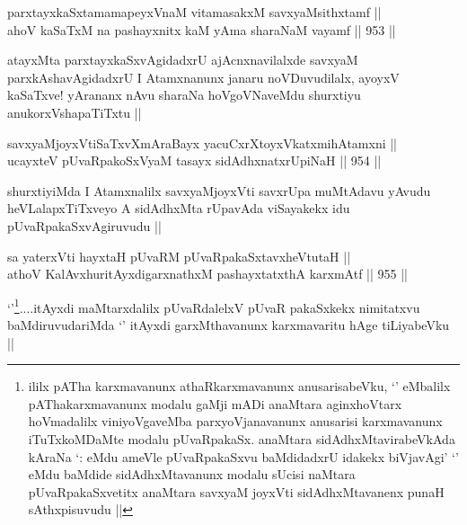 
\begin{shl}
parxtayxkaSxtamamapeyxVnaM vitamasakxM savxyaMsithxtamf || \\
ahoV kaSaTxM na pashayxnitx kaM yAma sharaNaM vayamf ||  953 ||  
\end{shl}

\begin{artha}
atayxMta parxtayxkaSxvAgidadxrU ajAcnxnavilalxde savxyaM parxkAshavAgidadxrU I Atamxnanunx janaru noVDuvudilalx, ayoyxV kaSaTxve! yArananx nAvu sharaNa hoVgoVNaveMdu shurxtiyu anukorxVshapaTiTxtu ||
\end{artha}


\begin{shl}
savxyaMjoyxVtiSaTxvXmAraBayx yacuCxrXtoyxVkatxmihA\s \s tamxni || \\
ucayxteV pUvaRpakoSxV\s yaM tasayx sidAdhxnatxrUpiNaH ||  954 ||  
\end{shl}

\begin{artha}
shurxtiyiMda I Atamxnalilx savxyaMjoyxVti savxrUpa muMtAdavu yAvudu heVLalapxTiTxveyo A sidAdhxMta rUpavAda viSayakekx idu pUvaRpakaSxvAgiruvudu ||
\end{artha}


\begin{shl}
sa yaterxVti hayxtaH pUvaRM pUvaRpakaSxtavxheVtutaH ||  \\
athoV KalAvxhuritAyxdigarxnathxM pashayxtatxthA karxmAtf ||  955 ||  
\end{shl}

\begin{artha}
`\stext'\footnote{ililx pATha karxmavanunx athaRkarxmavanunx anusarisabeVku, `\stext' eMbalilx pAThakarxmavanunx modalu gaMji mADi anaMtara aginxhoVtarx hoVmadalilx  viniyoVgaveMba parxyoVjanavanunx anusarisi karxmavanunx iTuTxkoMDaMte modalu pUvaRpakaSx. anaMtara sidAdhxMtavirabeVkAda kAraNa `\stext: eMdu ameVle pUvaRpakaSxvu baMdidadxrU idakekx biVjavAgi'  `\stext' eMdu baMdide sidAdhxMtavanunx modalu sUcisi naMtara pUvaRpakaSxvetitx anaMtara savxyaM joyxVti sidAdhxMtavanenx punaH sAthxpisuvudu ||}....itAyxdi maMtarxdalilx pUvaRdalelxV pUvaR pakaSxkekx nimitatxvu baMdiruvudariMda `\stext' itAyxdi garxMthavanunx karxmavaritu hAge tiLiyabeVku ||
\end{artha}

